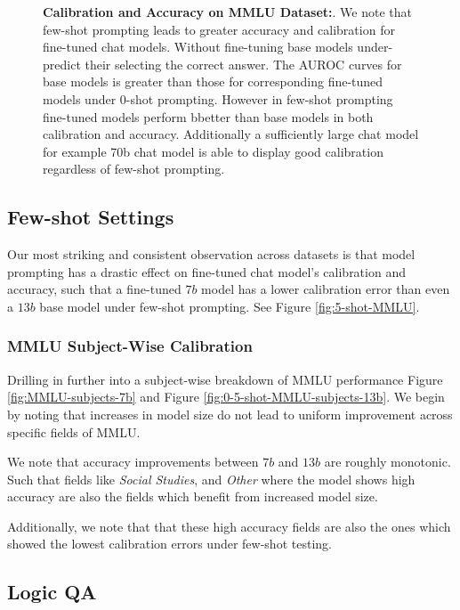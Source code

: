 \documentclass[11pt]{article}
\begin{document}
\begin{figure}
        \caption{\textbf{Calibration and Accuracy on MMLU Dataset:}. We note that few-shot prompting leads to greater accuracy and calibration for fine-tuned chat models. Without fine-tuning base models under-predict their selecting the correct answer. The AUROC curves for base models is greater than those for corresponding fine-tuned models under 0-shot prompting. However in few-shot prompting fine-tuned models perform bbetter than base models in both calibration and accuracy. Additionally a sufficiently large chat model for example 70b chat model is able to display good calibration regardless of few-shot prompting.}
        
        \label{fig:0-5-shot-MMLU}
\end{figure}
\FloatBarrier


\subsection{Few-shot Settings}

Our most striking and consistent observation across datasets 
is that model prompting has a drastic effect on fine-tuned chat 
model's calibration and accuracy, such that a fine-tuned $7 b$ 
model has a lower calibration error than even a $13 b$ base model 
under  few-shot prompting. See Figure \ref{fig:5-shot-MMLU}.


\subsubsection{MMLU Subject-Wise Calibration}

Drilling in further into a subject-wise breakdown of 
MMLU performance  Figure \ref{fig:MMLU-subjects-7b} and 
Figure \ref{fig:0-5-shot-MMLU-subjects-13b}. We begin by noting that increases 
in model size do not lead to uniform improvement across specific 
fields of MMLU. 

We note that accuracy improvements between $7b$ and 
$13b$ are roughly monotonic. Such that fields like 
\emph{Social Studies}, and \emph{Other} where the model shows 
high accuracy are also the fields which benefit from increased 
model size.

Additionally, we note that that these high accuracy fields are 
also the ones which showed the lowest calibration errors under 
few-shot testing.

\subsection{Logic QA}
\end{document}
